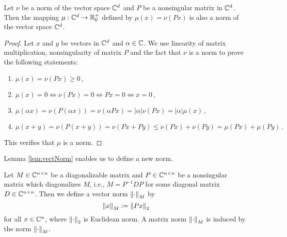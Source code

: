 

\begin{lem}
\label{lem:vectNorm}
Let $\nu$ be a norm of the vector space $\mathbb{C}^d$ and $P$ be a nonsingular matrix in $\mathbb{C}^d$. Then the mapping $\mu:\mathbb{C}^d\rightarrow \mathbb{R}^+_0$ defined by $\mu(x)=\nu(Px)$ is also a norm of the vector space $\mathbb{C}^d$.
\end{lem}
\begin{proof}
Let $x$ and $y$ be vectors in $\mathbb{C}^d$ and $\alpha\in \mathbb{C}$.  We use linearity of matrix multiplication, nonsingularity of matrix $P$ and the fact that $\nu$ is a norm to prove the following statements:
\begin{enumerate}
    \item $\mu(x)=\nu(Px)\geq 0\,,$
    \item $\mu(x)=0 \iff \nu(Px)=0 \iff Px=0 \iff x=0\,,$
    \item $\mu(\alpha x)=\nu(P(\alpha x))=\nu(\alpha Px)=|\alpha|\nu(Px)=|\alpha|\mu(x)\,,$
    \item $\mu(x+y)=\nu(P(x+y))=\nu(Px+Py)\leq \nu(Px)+\nu(Py)=\mu(Px)+\mu(Py)\,.$
\end{enumerate}
This  verifies that $\mu$ is a norm.
\end{proof}


Lemma \ref{lem:vectNorm} enables us to define a new norm.
\begin{defn}
\label{def:newNorm}
Let $M\in\mathbb{C}^{n\times n}$ be a diagonalizable matrix and $P\in\mathbb{C}^{n\times n}$ be a nonsingular matrix which diagonalizes $M$, i.e., $M=P^{-1}DP$ for some diagonal matrix $D\in\mathbb{C}^{n\times n}$. Then we define a vector norm $\left\lVert\cdot\right\rVert_{M}$ by  
\begin{equation}
\left\lVert x\right\rVert_{M}:=\left\lVert Px\right\rVert_{2}
\end{equation}
for all $x\in\mathbb{C}^n$, where $\left\lVert\cdot\right\rVert_{2}$ is Euclidean norm. A matrix norm $\left\lVert\cdot\right\rVert_{M}$ is induced by the norm $\left\lVert\cdot\right\rVert_{M}$.
\end{defn}

 

